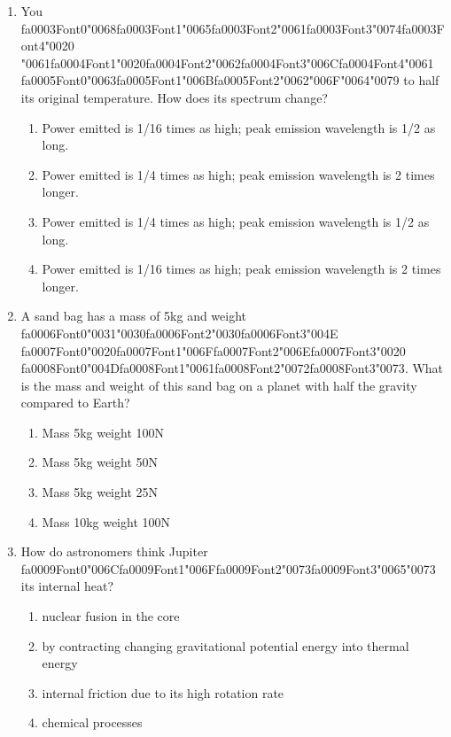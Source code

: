 \documentclass[12pt]{article}
\begin{document}
\begin{enumerate}[label=\arabic*.]
\item You {\csname fa0003Font0\endcsname\char"0068}{\csname fa0003Font1\endcsname\char"0065}{\csname fa0003Font2\endcsname\char"0061}{\csname fa0003Font3\endcsname\char"0074}{\csname fa0003Font4\endcsname\char"0020} {\char"0061}{\csname fa0004Font1\endcsname\char"0020}{\csname fa0004Font2\endcsname\char"0062}{\csname fa0004Font3\endcsname\char"006C}{\csname fa0004Font4\endcsname\char"0061} {\csname fa0005Font0\endcsname\char"0063}{\csname fa0005Font1\endcsname\char"006B}{\csname fa0005Font2\endcsname\char"0062}{\char"006F}{\char"0064}{\char"0079} to half its original temperature. How does its spectrum change?
\begin{enumerate}[label=(\alph*)]
    \item Power emitted is 1/16 times as high; peak emission wavelength is 1/2 as long.
    \item Power emitted is 1/4 times as high; peak emission wavelength is 2 times longer.
    \item Power emitted is 1/4 times as high; peak emission wavelength is 1/2 as long.
    \item Power emitted is 1/16 times as high; peak emission wavelength is 2 times longer.
\end{enumerate}
\item A sand bag has a mass of 5kg and weight {\csname fa0006Font0\endcsname\char"0031}{\char"0030}{\csname fa0006Font2\endcsname\char"0030}{\csname fa0006Font3\endcsname\char"004E} {\csname fa0007Font0\endcsname\char"0020}{\csname fa0007Font1\endcsname\char"006F}{\csname fa0007Font2\endcsname\char"006E}{\csname fa0007Font3\endcsname\char"0020} {\csname fa0008Font0\endcsname\char"004D}{\csname fa0008Font1\endcsname\char"0061}{\csname fa0008Font2\endcsname\char"0072}{\csname fa0008Font3\endcsname\char"0073}. What is the mass and weight of this
sand bag on a planet with half the gravity compared to Earth?
\begin{enumerate}[label=(\alph*)]
    \item Mass 5kg weight 100N
    \item Mass 5kg weight 50N
    \item Mass 5kg weight 25N
    \item Mass 10kg weight 100N
\end{enumerate}
\item How do astronomers think Jupiter {\csname fa0009Font0\endcsname\char"006C}{\csname fa0009Font1\endcsname\char"006F}{\csname fa0009Font2\endcsname\char"0073}{\csname fa0009Font3\endcsname\char"0065}{\char"0073} its internal heat?
\begin{enumerate}[label=(\alph*)]
    \item nuclear fusion in the core
    \item by contracting changing gravitational potential energy into thermal energy
    \item internal friction due to its high rotation rate
    \item chemical processes
\end{enumerate}
\end{enumerate}
\end{document}
